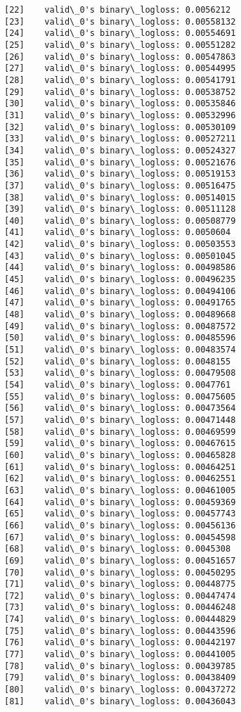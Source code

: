 \documentclass[11pt]{article}
\begin{document}
\begin{Verbatim}[commandchars=\\\{\}]
[22]	valid\_0's binary\_logloss: 0.0056212
[23]	valid\_0's binary\_logloss: 0.00558132
[24]	valid\_0's binary\_logloss: 0.00554691
[25]	valid\_0's binary\_logloss: 0.00551282
[26]	valid\_0's binary\_logloss: 0.00547863
[27]	valid\_0's binary\_logloss: 0.00544995
[28]	valid\_0's binary\_logloss: 0.00541791
[29]	valid\_0's binary\_logloss: 0.00538752
[30]	valid\_0's binary\_logloss: 0.00535846
[31]	valid\_0's binary\_logloss: 0.00532996
[32]	valid\_0's binary\_logloss: 0.00530109
[33]	valid\_0's binary\_logloss: 0.00527211
[34]	valid\_0's binary\_logloss: 0.00524327
[35]	valid\_0's binary\_logloss: 0.00521676
[36]	valid\_0's binary\_logloss: 0.00519153
[37]	valid\_0's binary\_logloss: 0.00516475
[38]	valid\_0's binary\_logloss: 0.00514015
[39]	valid\_0's binary\_logloss: 0.00511128
[40]	valid\_0's binary\_logloss: 0.00508779
[41]	valid\_0's binary\_logloss: 0.0050604
[42]	valid\_0's binary\_logloss: 0.00503553
[43]	valid\_0's binary\_logloss: 0.00501045
[44]	valid\_0's binary\_logloss: 0.00498586
[45]	valid\_0's binary\_logloss: 0.00496235
[46]	valid\_0's binary\_logloss: 0.00494106
[47]	valid\_0's binary\_logloss: 0.00491765
[48]	valid\_0's binary\_logloss: 0.00489668
[49]	valid\_0's binary\_logloss: 0.00487572
[50]	valid\_0's binary\_logloss: 0.00485596
[51]	valid\_0's binary\_logloss: 0.00483574
[52]	valid\_0's binary\_logloss: 0.0048155
[53]	valid\_0's binary\_logloss: 0.00479508
[54]	valid\_0's binary\_logloss: 0.0047761
[55]	valid\_0's binary\_logloss: 0.00475605
[56]	valid\_0's binary\_logloss: 0.00473564
[57]	valid\_0's binary\_logloss: 0.00471448
[58]	valid\_0's binary\_logloss: 0.00469599
[59]	valid\_0's binary\_logloss: 0.00467615
[60]	valid\_0's binary\_logloss: 0.00465828
[61]	valid\_0's binary\_logloss: 0.00464251
[62]	valid\_0's binary\_logloss: 0.00462551
[63]	valid\_0's binary\_logloss: 0.00461005
[64]	valid\_0's binary\_logloss: 0.00459369
[65]	valid\_0's binary\_logloss: 0.00457743
[66]	valid\_0's binary\_logloss: 0.00456136
[67]	valid\_0's binary\_logloss: 0.00454598
[68]	valid\_0's binary\_logloss: 0.0045308
[69]	valid\_0's binary\_logloss: 0.00451657
[70]	valid\_0's binary\_logloss: 0.00450295
[71]	valid\_0's binary\_logloss: 0.00448775
[72]	valid\_0's binary\_logloss: 0.00447474
[73]	valid\_0's binary\_logloss: 0.00446248
[74]	valid\_0's binary\_logloss: 0.00444829
[75]	valid\_0's binary\_logloss: 0.00443596
[76]	valid\_0's binary\_logloss: 0.00442197
[77]	valid\_0's binary\_logloss: 0.00441005
[78]	valid\_0's binary\_logloss: 0.00439785
[79]	valid\_0's binary\_logloss: 0.00438409
[80]	valid\_0's binary\_logloss: 0.00437272
[81]	valid\_0's binary\_logloss: 0.00436043

\end{Verbatim}
\end{document}
